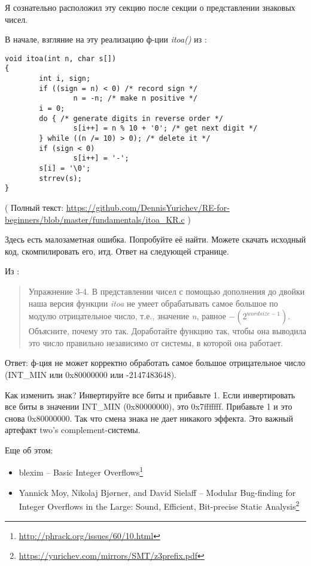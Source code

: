 
Я сознательно расположил эту секцию после секции о представлении знаковых чисел.

В начале, взгляние на эту реализацию ф-ции \emph{itoa()} из \InSqBrackets{\KRBook}:

\begin{lstlisting}[style=customc]
void itoa(int n, char s[])
{
        int i, sign;
        if ((sign = n) < 0) /* record sign */
                n = -n; /* make n positive */
        i = 0;
        do { /* generate digits in reverse order */
                s[i++] = n % 10 + '0'; /* get next digit */
        } while ((n /= 10) > 0); /* delete it */
        if (sign < 0)
                s[i++] = '-';
        s[i] = '\0';
        strrev(s);
}
\end{lstlisting}

( Полный текст: \url{https://github.com/DennisYurichev/RE-for-beginners/blob/master/fundamentals/itoa_KR.c} )

Здесь есть малозаметная ошибка. Попробуйте её найти. Можете скачать исходный код, скомпилировать его, итд.
Ответ на следующей странице.

\clearpage

Из \InSqBrackets{\KRBook}:

\begin{framed}
\begin{quotation}
Упражнение 3-4. В представлении чисел с помощью дополнения до двойки наша версия функции \emph{itoa}
не умеет обрабатывать самое большое по модулю отрицательное число, т.е., значение 
\emph{n}, равное $-(2^{wordsize-1})$. Объясните, почему это так. Доработайте функцию так, чтобы она
выводила это число правильно независимо от системы, в которой она работает.
\end{quotation}
\end{framed}

Ответ: ф-ция не может корректно обработать самое большое отрицательное число (INT\_MIN или 0x80000000 или -2147483648).

Как изменить знак? Инвертируйте все биты и прибавьте 1.
Если инвертировать все биты в значении INT\_MIN (0x80000000), это 0x7fffffff. Прибавьте 1 и это снова 0x80000000.
Так что смена знака не дает никакого эффекта.
Это важный артефакт two's complement-системы.

Еще об этом:

\begin{itemize}
\item blexim -- Basic Integer Overflows\footnote{\url{http://phrack.org/issues/60/10.html}}

\item Yannick Moy, Nikolaj Bjørner, and David Sielaff -- Modular Bug-finding for Integer Overflows in the Large: Sound, Efficient, Bit-precise Static Analysis\footnote{\url{https://yurichev.com/mirrors/SMT/z3prefix.pdf}}
\end{itemize}

